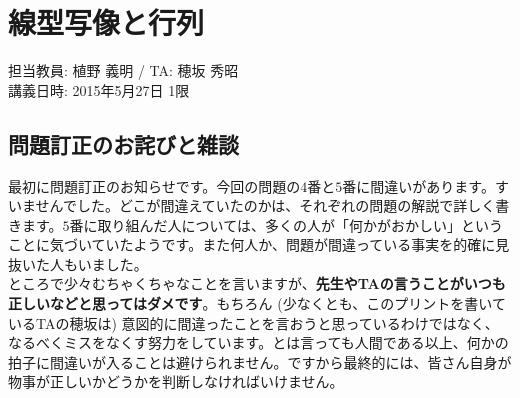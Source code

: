 \chapter{線型写像と行列}

\begin{flushright}
担当教員: 植野 義明 / TA: 穂坂 秀昭 \\
講義日時: 2015年5月27日 1限
\end{flushright}

\section{問題訂正のお詫びと雑談}

最初に問題訂正のお知らせです。今回の問題の$4$番と$5$番に間違いがあります。すいませんでした。どこが間違えていたのかは、それぞれの問題の解説で詳しく書きます。$5$番に取り組んだ人については、多くの人が「何かがおかしい」ということに気づいていたようです。また何人か、問題が間違っている事実を的確に見抜いた人もいました。\\

ところで少々むちゃくちゃなことを言いますが、\textbf{先生やTAの言うことがいつも正しいなどと思ってはダメです}。もちろん (少なくとも、このプリントを書いているTAの穂坂は) 意図的に間違ったことを言おうと思っているわけではなく、なるべくミスをなくす努力をしています。とは言っても人間である以上、何かの拍子に間違いが入ることは避けられません。ですから最終的には、皆さん自身が物事が正しいかどうかを判断しなければいけません。

